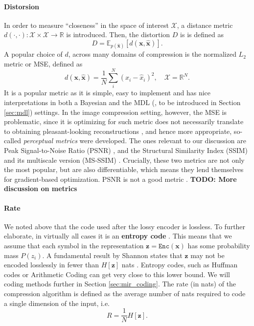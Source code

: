 \documentclass{article}
\renewcommand{\vec}[1]{\mathbf{#1}}
\newcommand{\Enc}{\mathtt{Enc}}
\newcommand{\Exp}{\mathbb{E}}
\newcommand{\ImSpace}{\mathcal{X}}
\newcommand{\Reals}{\mathbb{R}}
\begin{document}
\paragraph{Distorsion}
In order to measure ``closeness'' in the space of interest $\ImSpace$,
a distance metric $d(\cdot, \cdot): \ImSpace
\times \ImSpace \rightarrow \Reals$ is introduced. Then, the distortion $D$ is 
is defined as
\[
  D = \Exp_{p(\vec{\hat{x}})}[d(\vec{x}, \vec{\hat{x}})].
\]
A popular choice of $d$, across many domains of compression is the normalized $L_2$ metric
or MSE, defined as
\[
  d(\vec{x}, \vec{\hat{x}}) = \frac{1}{N} \sum_{i}^N (x_i - \hat{x}_i)^2, \quad
  \ImSpace = \Reals^N.
\]
It is a popular metric as it is simple, easy to implement and has nice
interpretations in both a Bayesian \cite{bishop2013pattern} and the MDL
(\cite{hinton1993keeping}, to be introduced in Section \ref{sec:mdl}) settings.
In the image compression setting, however, the MSE is problematic, since it is
optimizing for such metric does not necessarily translate to obtaining pleasant-looking
reconstructions \cite{zhao2015loss}, and hence more appropriate, so-called \textit{perceptual
  metrics} were developed. The ones relevant to our discussion are Peak
Signal-to-Noise Ratio (PSNR) \cite{psnr}, \cite{gupta2011modified} and the
Structural Similarity Index (SSIM) \cite{wang2004image} and its multiscale
version (MS-SSIM) \cite{msssim}. Crucially, these
two metrics are not only the most popular, but are also differentiable, which
means they lend themselves for gradient-based optimization.
PSNR is not a good metric \cite{girod1993s} \cite{eskicioglu1994image}.
\textbf{TODO: More discussion on metrics}

\paragraph{Rate}
We noted above that the code used after the lossy encoder is lossless. To
further elaborate, in virtually all cases it is an \textbf{entropy code}
\cite{goyal2001theoretical}. This means that we assume that each symbol
in the representation $\vec{z} = \Enc(\vec{x})$ has some probability mass
$P(z_i)$. A fundamental result by Shannon states that $\vec{z}$ may not be
encoded losslessly in fewer than $H[\vec{z}]$ nats
\cite{shannon1998mathematical}. Entropy codes, such as Huffman codes
\cite{huffman1952method} or Arithmetic Coding \cite{rissanen1981universal} can
get very close to this lower bound. We will coding methods further in Section
\ref{sec:mir_coding}. The rate (in nats) of the compression algorithm is defined
as the average number of nats required to code a single dimension of the input, i.e.
\[
  R = \frac{1}{N} H[\vec{z}].
\]
\end{document}
